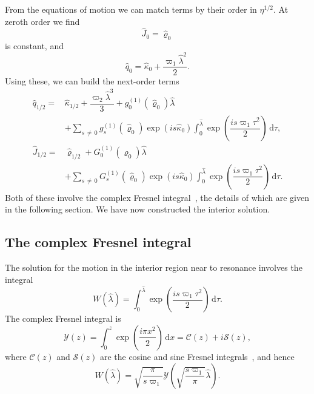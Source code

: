 \documentclass[aps,prd,amsfonts,amssymb,amsmath,nofootinbib,showpacs,superscriptaddress,twocolumn,floatfix]{revtex4-1}
\newcommand{\dd}{\ensuremath{\mathrm{d}}}
\newcommand{\intd}[4]{\ensuremath{\int_{#1}^{#2}{#3}\,\dd{#4}}}
\begin{document}
From the equations of motion we can match terms by their order in $\eta^{1/2}$. At zeroth order we find
\begin{equation}
\widehat{J}_0 = \widehat{\varrho}_0
\end{equation}
is constant, and
\begin{equation}
\widehat{q}_0 = \widehat{\kappa}_0 + \dfrac{\varpi_1\widehat{\lambda}^2}{2}.
\end{equation}
Using these, we can build the next-order terms
\begin{align}
\widehat{q}_{1/2} = {} & \widehat{\kappa}_{1/2} + \dfrac{\varpi_2\widehat{\lambda}^3}{3} + g_0^{(1)}(\widehat{\varrho}_0)\widehat{\lambda} \nonumber \\ 
 {} & + \sum_{s\,\neq\,0}g_s^{(1)}(\widehat{\varrho}_0)\exp(is \widehat{\kappa}_0)\intd{0}{\hat{\lambda}}{\exp\left(\dfrac{is \varpi_1\tau^2}{2}\right)}{\tau}, \\
\widehat{J}_{1/2} = {} & \widehat{\varrho}_{1/2} + G_0^{(1)}(\widehat{\varrho}_0)\widehat{\lambda} \nonumber \\
 {} & + \sum_{s\,\neq\,0}G_s^{(1)}(\widehat{\varrho}_0)\exp(is \widehat{\kappa}_0)\intd{0}{\hat{\lambda}}{\exp\left(\dfrac{is \varpi_1\tau^2}{2}\right)}{\tau}.
\end{align}
Both of these involve the complex Fresnel integral~\cite{Olver2010}, the details of which are given in the following section. We have now constructed the interior solution. %

\subsection{The complex Fresnel integral}

The solution for the motion in the interior region near to resonance involves the integral
\begin{equation}
W\left(\widehat{\lambda}\right) = \intd{0}{\hat{\lambda}}{\exp\left(\dfrac{is \varpi_1\tau^2}{2}\right)}{\tau}.
\end{equation}
The complex Fresnel integral is
\begin{equation}
\mathcal{Y}(z) = \intd{0}{z}{\exp\left(\dfrac{i\pi x^2}{2}\right)}{x} = \mathcal{C}(z) + i\mathcal{S}(z),
\end{equation}
where $\mathcal{C}(z)$ and $\mathcal{S}(z)$ are the cosine and sine Fresnel integrals~\cite{Olver2010}, and hence %
\begin{equation}
W\left(\widehat{\lambda}\right) = \sqrt{\dfrac{\pi}{s\varpi_1}}\mathcal{Y}\left(\sqrt{\dfrac{s\varpi_1}{\pi}}\widehat{\lambda}\right).
\end{equation}
\end{document}
